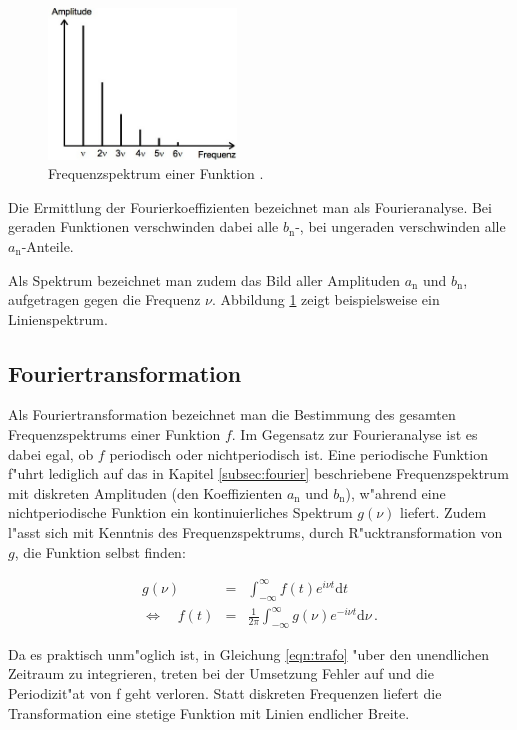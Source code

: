 		\begin{figure}
			\centering
			\includegraphics[width = 5cm]{img/spektrum.jpeg}
			\captionsetup{format=plain}
			\caption{Frequenzspektrum einer Funktion \cite{anleitung}.}
			\label{fig:spektrum}
		\end{figure}

		Die Ermittlung der Fourierkoeffizienten bezeichnet man als Fourieranalyse.
		Bei geraden Funktionen verschwinden dabei alle $b_\mathrm{n}$-, bei ungeraden verschwinden alle $a_\mathrm{n}$-Anteile.

		Als Spektrum bezeichnet man zudem das Bild aller Amplituden $a_\mathrm{n}$ und $b_\mathrm{n}$, aufgetragen gegen die Frequenz $\nu$.
		Abbildung \ref{fig:spektrum} zeigt beispielsweise ein Linienspektrum.

		\clearpage

	\subsection{Fouriertransformation}
	\label{subsec:trafo}
		Als Fouriertransformation bezeichnet man die Bestimmung des gesamten Frequenzspektrums einer Funktion $f$.
		Im Gegensatz zur Fourieranalyse ist es dabei egal, ob $f$ periodisch oder nichtperiodisch ist.
		Eine periodische Funktion f"uhrt lediglich auf das in Kapitel \ref{subsec:fourier} beschriebene Frequenzspektrum mit diskreten Amplituden (den Koeffizienten $a_\mathrm{n}$ und $b_\mathrm{n}$), w"ahrend eine nichtperiodische Funktion ein kontinuierliches Spektrum $g(\nu)$ liefert.
		Zudem l"asst sich mit Kenntnis des Frequenzspektrums, durch R"ucktransformation von $g$, die Funktion selbst finden:

		\begin{eqnarray}
			\label{eqn:trafo} g(\nu) & = & \int_{-\infty}^\infty{f(t) e^{i\nu t} \mathrm{d}t} \\
			\label{eqn:ruecktrafo} \Leftrightarrow \quad f(t) & = & \frac{1}{2 \pi} \int_{-\infty}^{\infty}{g(\nu) e^{-i\nu t} \mathrm{d}\nu} \,.
		\end{eqnarray}

		Da es praktisch unm"oglich ist, in Gleichung \eqref{eqn:trafo} "uber den unendlichen Zeitraum zu integrieren, treten bei der Umsetzung Fehler auf und die Periodizit"at von f geht verloren.
		Statt diskreten Frequenzen liefert die Transformation eine stetige Funktion mit Linien endlicher Breite.